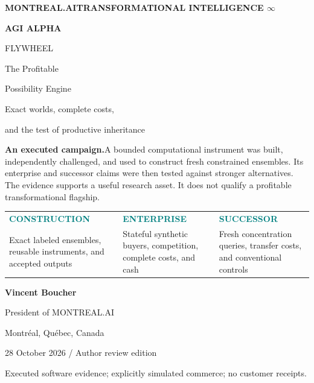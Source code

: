 \documentclass[11pt,letterpaper]{article}
\begin{document}
\begin{titlepage}
\color{ink}
{\sffamily\small\bfseries MONTREAL.AI\hfill TRANSFORMATIONAL INTELLIGENCE $\infty$\par}
\vspace{0.7in}
{\sffamily\fontsize{35}{38}\selectfont\bfseries AGI ALPHA\par FLYWHEEL\par}
\vspace{0.2in}
{\sffamily\fontsize{22}{26}\selectfont The Profitable\par Possibility Engine\par}
\vspace{0.25in}
{\Large Exact worlds, complete costs,\par and the test of productive inheritance\par}
\vspace{0.38in}
\begin{evidencebox}
\textbf{An executed campaign.}\quad A bounded computational instrument was built,
independently challenged, and used to construct fresh constrained ensembles.
Its enterprise and successor claims were then tested against stronger alternatives.
The evidence supports a useful research asset. It does not qualify a profitable
transformational flagship.
\end{evidencebox}
\vspace{0.25in}
\begin{tabularx}{\linewidth}{@{}YYY@{}}
\textcolor{teal}{\sffamily\bfseries CONSTRUCTION}&
\textcolor{teal}{\sffamily\bfseries ENTERPRISE}&
\textcolor{teal}{\sffamily\bfseries SUCCESSOR}\\[4pt]
Exact labeled ensembles, reusable instruments, and accepted outputs&
Stateful synthetic buyers, competition, complete costs, and cash&
Fresh concentration queries, transfer costs, and conventional controls
\end{tabularx}
\vfill
{\large\bfseries Vincent Boucher\par}
{\sffamily President of MONTREAL.AI\par Montréal, Québec, Canada\par}
\vspace{0.2in}
{\sffamily\small 28 October 2026 / Author review edition\par}
{\small Executed software evidence; explicitly simulated commerce; no customer receipts.\par}
\end{titlepage}
\end{document}
